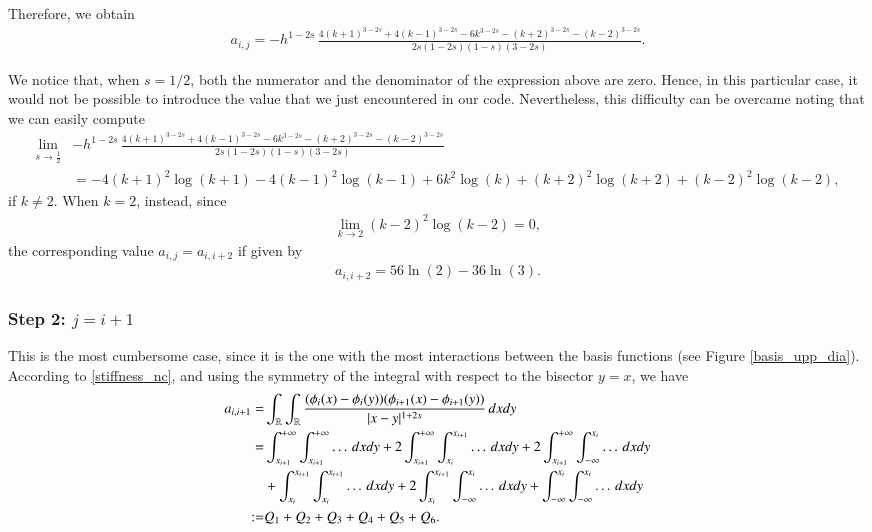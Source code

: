 {Therefore, we obtain
\begin{align*}
	a_{i,j} = - h^{1-2s}\,\frac{4(k+1)^{3-2s} + 4(k-1)^{3-2s}-6k^{3-2s}-(k+2)^{3-2s}-(k-2)^{3-2s}}{2s(1-2s)(1-s)(3-2s)}.
\end{align*} 

We notice that, when $s=1/2$, both the numerator and the denominator of the expression above are zero. Hence, in this particular case, it would not be possible to introduce the value that we just encountered in our code. Nevertheless, this difficulty can be overcame noting that we can easily compute
\begin{align*}
	\lim_{s\to\frac{1}{2}} &- h^{1-2s}\,\frac{4(k+1)^{3-2s} + 4(k-1)^{3-2s}-6k^{3-2s}-(k+2)^{3-2s}-(k-2)^{3-2s}}{2s(1-2s)(1-s)(3-2s)}
	\\
	& = -4(k+1)^2\log(k+1)-4(k-1)^2\log(k-1)+6k^2\log(k)+(k+2)^2\log(k+2)+(k-2)^2\log(k-2),
\end{align*} 
if $k\neq 2$. When $k=2$, instead, since 
\begin{align*}
	\lim_{k\to 2} (k-2)^2\log(k-2) =0,
\end{align*}
the corresponding value $a_{i,j}=a_{i,i+2}$ if given by 
\begin{align*}
	a_{i,i+2} = 56\ln(2)-36\ln(3).
\end{align*}


\subsubsection*{Step 2: $j= i+1$}
This is the most cumbersome case, since it is the one with the most interactions between the basis functions (see Figure \ref{basis_upp_dia}). According to \eqref{stiffness_nc}, and using the symmetry of the integral with respect to the bisector $y=x$, we have 
	\begin{align*}
	a_{i,i+1}= & \int_{\mathbb{R}}\int_{\mathbb{R}}\frac{(\phi_i(x)-\phi_i(y))(\phi_{i+1}(x)-\phi_{i+1}(y))}{|x-y|^{1+2s}}\,dxdy
	\\
	= & \int_{x_{i+1}}^{+\infty}\int_{x_{i+1}}^{+\infty} \ldots\,dxdy + 2\int_{x_{i+1}}^{+\infty}\int_{x_i}^{x_{i+1}} \ldots\,dxdy + 2\int_{x_{i+1}}^{+\infty}\int_{-\infty}^{x_i} \ldots\,dxdy 
	\\
	& + \int_{x_i}^{x_{i+1}}\int_{x_i}^{x_{i+1}} \ldots\,dxdy + 2\int_{x_i}^{x_{i+1}}\int_{-\infty}^{x_i} \ldots\,dxdy + \int_{-\infty}^{x_i}\int_{-\infty}^{x_i} \ldots\,dxdy 
	\\
	:= & Q_1 + Q_2 + Q_3 + Q_4 + Q_5 + Q_6.
\end{align*}

}
